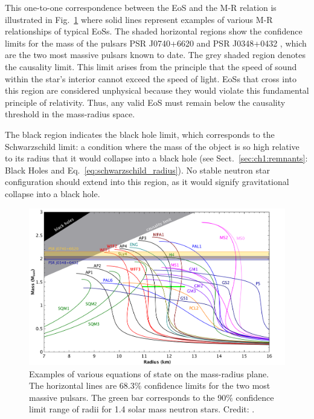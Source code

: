 \documentclass[main.tex]{subfiles}
\begin{document}
    This one-to-one correspondence between the EoS and the M-R relation is illustrated in Fig.~\ref{fig:M-R} where solid lines represent examples of various M-R relationships of typical EoSs. The shaded horizontal regions show the confidence limits for the mass of the pulsars PSR J0740+6620 \citep{2020NatAs...4...72C, Fonseca_2021} and PSR J0348+0432 \citep{antoniadis:2013sci}, which are the two most massive pulsars known to date. The grey shaded region denotes the causality limit. This limit arises from the principle that the speed of sound within the star's interior cannot exceed the speed of light. EoSs that cross into this region are considered unphysical because they would violate this fundamental principle of relativity. Thus, any valid EoS must remain below the causality threshold in the mass-radius space.

    The black region indicates the black hole limit, which corresponds to the Schwarzschild limit: a condition where the mass of the object is so high relative to its radius that it would collapse into a black hole (see Sect.~\ref{sec:ch1:remnants}: Black Holes and Eq.~\ref{eq:schwarzschild_radius}). No stable neutron star configuration should extend into this region, as it would signify gravitational collapse into a black hole.

    \begin{figure}
        \centering
        \includegraphics[scale=0.25]{figures/chapter1/M-R.pdf}
        \caption{Examples of various equations of state on the mass-radius plane. The horizontal lines are 68.3\% confidence limits for the two most massive pulsars. The green bar corresponds to the 90\% confidence limit range of radii for 1.4 solar mass neutron stars. Credit: \cite{freire_ns_masses}.}
        \label{fig:M-R}
    \end{figure}
\end{document}
